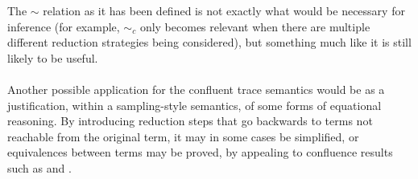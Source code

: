 The $\sim$ relation as it has been defined is not exactly what would be necessary for inference (for example, $\sim_c$ only becomes relevant when there are multiple different reduction strategies being considered), but something much like it is still likely to be useful.

\paragraph{}
Another possible application for the confluent trace semantics would be as a justification, within a sampling-style semantics, of some forms of equational reasoning. By introducing reduction steps that go backwards to terms not reachable from the original term, it may in some cases be simplified, or equivalences between terms may be proved, by appealing to confluence results such as  and .
